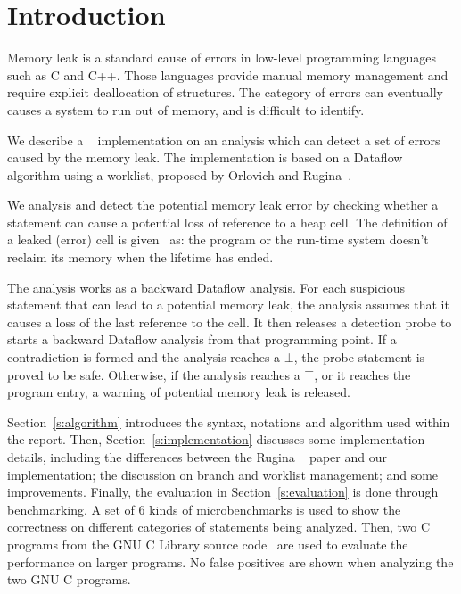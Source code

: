 \section{Introduction}
Memory leak is a standard cause of errors in low-level programming languages
such as C and C++. Those languages provide manual memory management and require
explicit deallocation of structures. The category of errors can eventually
causes a system to run out of memory, and is difficult to identify.

We describe a \llvm~\cite{llvm} implementation on an analysis which
can detect a set of errors caused by the memory leak. The implementation is
based on a Dataflow algorithm using a worklist, proposed by Orlovich and 
Rugina~\cite{rugina}.

We analysis and detect the potential memory leak error
by checking whether a statement can cause a potential loss of reference to a 
heap cell. The definition of a leaked (error) cell is given~\cite{rugina} as: the 
program or the run-time system doesn't reclaim its memory when the lifetime 
has ended.

The analysis works as a backward Dataflow analysis. For each suspicious 
statement that can lead to a potential memory leak, the analysis assumes that 
it causes a loss of the last reference to the cell.
It then releases a detection probe to starts a backward 
Dataflow analysis from that programming point. If a contradiction is formed 
and the analysis reaches a $\bot$, the probe statement is proved to be safe. 
Otherwise, if the analysis reaches a $\top$, or it reaches the program entry, 
a warning of potential memory leak is released.

Section~\ref{s:algorithm} introduces the syntax, notations and algorithm
used within the report. Then, Section~\ref{s:implementation} discusses 
some implementation details, including the differences between the Rugina
~\cite{rugina} paper and our implementation; the discussion 
on branch and worklist management; and some improvements. 
Finally, the evaluation in Section~\ref{s:evaluation} is done through 
benchmarking. A set of 6 kinds
of microbenchmarks is used to show the correctness on different categories of
statements being analyzed. Then, two C programs from the GNU C Library source
code~\cite{glibc} are used to evaluate the performance on larger programs. No 
false positives are shown when analyzing the two GNU C programs.
